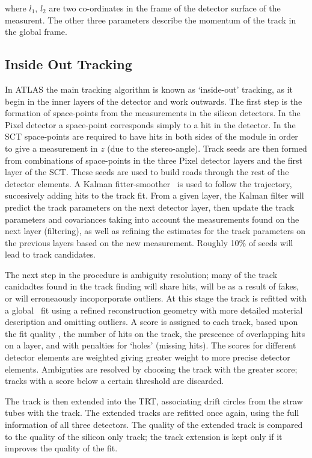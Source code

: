 where $l_{1}$, $l_{2}$ are two co-ordinates in the frame of the detector surface
of the measurent. The other three parameters describe the momentum of the track
in the global frame.

\subsection{Inside Out Tracking}

In ATLAS the main tracking algorithm is known as `inside-out' tracking, as it
begin in the inner layers of the detector and work outwards. The first step is
the formation of space-points from the measurements in the silicon detectors. In
the Pixel detector a space-point corresponds simply to a hit in the detector. In
the SCT space-points are required to have hits in both sides of the module in
order to give a measurement in $z$ (due to the stereo-angle). Track seeds are
then formed from combinations of space-points in the three Pixel detector layers
and the first layer of the SCT. These seeds are used to build roads through the
rest of the detector elements. A Kalman fitter-smoother~\cite{Fruhwirth:1987fm} is used to follow the
trajectory, succesively adding hits to the track fit. From a given layer, the
Kalman filter will predict the track parameters on the next detector layer, then
update the track parameters and covariances taking into account the measurements
found on the next layer (filtering), as well as refining the estimates for the
track parameters on the previous layers based on the new measurement. Roughly
10\% of seeds will lead to track candidates.

The next step in the procedure is ambiguity resolution; many of the track
canidadtes found in the track finding will share hits, will be as a result of
fakes, or will erroneaously incoporporate outliers. At this stage the track is
refitted with a global \chisquared\ fit using a refined reconstruction geometry
with more detailed material description and omitting outliers. 
A score is assigned to each track, based upon the fit quality \chisqauredndof,
the number of hits on the track, the prescence of overlapping hits on a layer,
and with
penalties for `holes' (missing hits). The scores for different detector elements
are weighted giving greater weight to more precise detector elements. Ambiguties
are resolved by choosing the track with the greater score; tracks with a score
below a certain threshold are discarded.

The track is then extended into the TRT, associating drift circles from the
straw tubes with the track. The extended tracks are refitted once again, using
the full information of all three detectors. The quality of the extended track
is compared to the quality of the silicon only track; the track extension is
kept only if it improves the quality of the fit.

